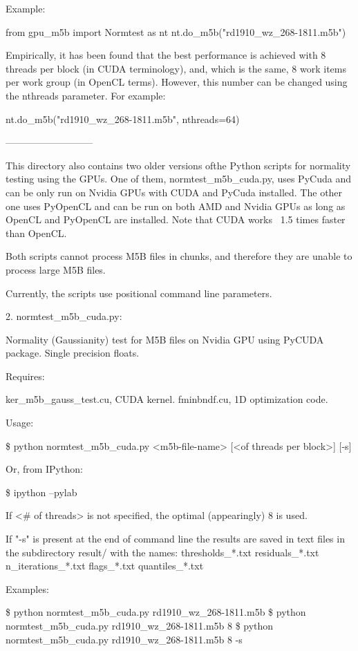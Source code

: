 \documentclass[letterpaper,twoside,12pt]{article}
\begin{document}
   
Example:
   
from gpu_m5b import Normtest as nt
nt.do_m5b("rd1910_wz_268-1811.m5b")

Empirically, it has been found that the best performance is achieved 
with 8 threads per block (in CUDA terminology), and, which is the same, 
8 work items per work group (in OpenCL terms). However, this number can 
be changed using the nthreads parameter. For example:

nt.do_m5b("rd1910_wz_268-1811.m5b", nthreads=64)


---------------------------

This directory also contains two older versions ofthe Python scripts for
normality testing using the GPUs. One of them, normtest_m5b_cuda.py, uses
PyCuda and can be only run on Nvidia GPUs with CUDA and PyCuda installed.
The other one uses PyOpenCL and can be run on both AMD and Nvidia GPUs as
long as OpenCL and PyOpenCL are installed. Note that CUDA works ~1.5 times
faster than OpenCL.

Both scripts cannot process M5B files in chunks, and therefore they are unable
to process large M5B files.

Currently, the scripts use positional command line parameters.

2. normtest_m5b_cuda.py:

Normality (Gaussianity) test for M5B files on Nvidia GPU using PyCUDA package.
Single precision floats.

Requires:

ker_m5b_gauss_test.cu, CUDA kernel.
fminbndf.cu, 1D optimization code.

Usage:

\$ python normtest_m5b_cuda.py <m5b-file-name> [<of threads per block>] [-s]

Or, from IPython:

\$ ipython --pylab


If <# of threads> is not specified, the optimal (appearingly) 8 is used.

If "-s" is present at the end of command line the results are saved in text
files in the subdirectory result/ with the names:
   thresholds_*.txt
   residuals_*.txt
   n_iterations_*.txt
   flags_*.txt
   quantiles_*.txt

Examples:

\$ python normtest_m5b_cuda.py rd1910_wz_268-1811.m5b
\$ python normtest_m5b_cuda.py rd1910_wz_268-1811.m5b 8
\$ python normtest_m5b_cuda.py rd1910_wz_268-1811.m5b 8 -s
\end{document}
